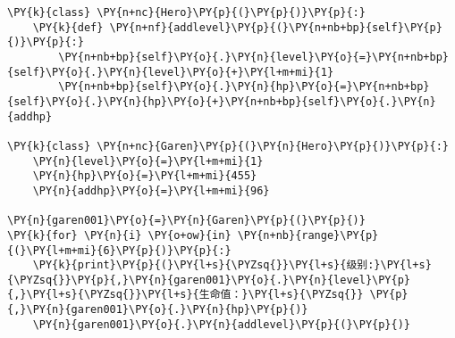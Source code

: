 \begin{Verbatim}[commandchars=\\\{\}]
\PY{k}{class} \PY{n+nc}{Hero}\PY{p}{(}\PY{p}{)}\PY{p}{:}
    \PY{k}{def} \PY{n+nf}{addlevel}\PY{p}{(}\PY{n+nb+bp}{self}\PY{p}{)}\PY{p}{:}
        \PY{n+nb+bp}{self}\PY{o}{.}\PY{n}{level}\PY{o}{=}\PY{n+nb+bp}{self}\PY{o}{.}\PY{n}{level}\PY{o}{+}\PY{l+m+mi}{1}
        \PY{n+nb+bp}{self}\PY{o}{.}\PY{n}{hp}\PY{o}{=}\PY{n+nb+bp}{self}\PY{o}{.}\PY{n}{hp}\PY{o}{+}\PY{n+nb+bp}{self}\PY{o}{.}\PY{n}{addhp}

\PY{k}{class} \PY{n+nc}{Garen}\PY{p}{(}\PY{n}{Hero}\PY{p}{)}\PY{p}{:}
    \PY{n}{level}\PY{o}{=}\PY{l+m+mi}{1}
    \PY{n}{hp}\PY{o}{=}\PY{l+m+mi}{455}
    \PY{n}{addhp}\PY{o}{=}\PY{l+m+mi}{96}

\PY{n}{garen001}\PY{o}{=}\PY{n}{Garen}\PY{p}{(}\PY{p}{)}
\PY{k}{for} \PY{n}{i} \PY{o+ow}{in} \PY{n+nb}{range}\PY{p}{(}\PY{l+m+mi}{6}\PY{p}{)}\PY{p}{:}
    \PY{k}{print}\PY{p}{(}\PY{l+s}{\PYZsq{}}\PY{l+s}{级别:}\PY{l+s}{\PYZsq{}}\PY{p}{,}\PY{n}{garen001}\PY{o}{.}\PY{n}{level}\PY{p}{,}\PY{l+s}{\PYZsq{}}\PY{l+s}{生命值：}\PY{l+s}{\PYZsq{}} \PY{p}{,}\PY{n}{garen001}\PY{o}{.}\PY{n}{hp}\PY{p}{)}
    \PY{n}{garen001}\PY{o}{.}\PY{n}{addlevel}\PY{p}{(}\PY{p}{)}
\end{Verbatim}
